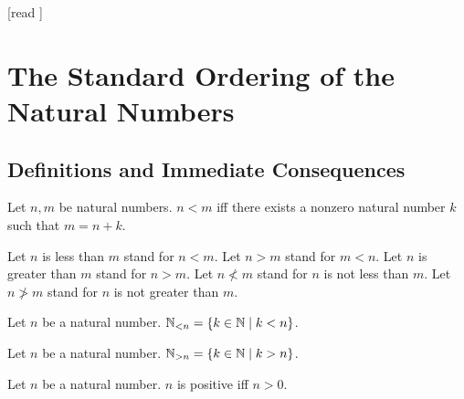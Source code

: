 \documentclass[10pt]{article}
\begin{document}
  \begin{imports}
    \begin{forthel}
      [read ]
    \end{forthel}
  \end{imports}


  \section*{The Standard Ordering of the Natural Numbers}

  \subsection*{Definitions and Immediate Consequences}

  \begin{forthel}
    \begin{definition}[id=ARITHMETIC_04_1926295512416256,printid]
      Let $n, m$ be natural numbers.
      $n < m$ iff there exists a nonzero natural number $k$ such that $m = n + k$.
    \end{definition}

    Let $n$ is less than $m$ stand for $n < m$.
    Let $n > m$ stand for $m < n$.
    Let $n$ is greater than $m$ stand for $n > m$.
    Let $n \nless m$ stand for $n$ is not less than $m$.
    Let $n \ngtr m$ stand for $n$ is not greater than $m$.
  \end{forthel}

  \begin{forthel}
    \begin{definition}[id=ARITHMETIC_04_3668680374222848,printid]
      Let $n$ be a natural number.
      $\mathbb{N}_{< n} = \{ k \in \mathbb{N} \mid k < n \}$.
    \end{definition}
  \end{forthel}

  \begin{forthel}
    \begin{definition}[id=ARITHMETIC_04_3670333934534656,printid]
      Let $n$ be a natural number.
      $\mathbb{N}_{> n} = \{ k \in \mathbb{N} \mid k > n \}$.
    \end{definition}
  \end{forthel}

  \begin{forthel}
    \begin{definition}[id=ARITHMETIC_04_7916616566177792,printid]
      Let $n$ be a natural number.
      $n$ is positive iff $n > 0$.
    \end{definition}
  \end{forthel}
\end{document}
